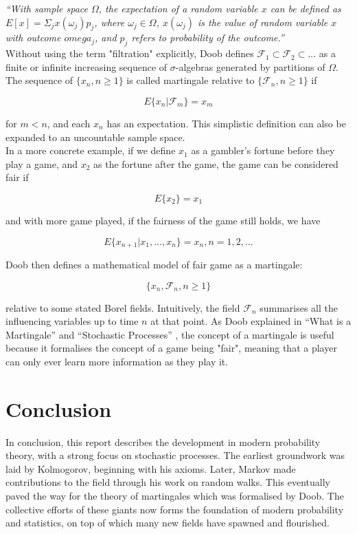 \documentclass{article}
\begin{document}
\textit{``With sample space $\Omega$, the expectation of a random variable $x$ can be defined as $E[x]=\Sigma_j x(\omega_j)p_j$, where $\omega_j \in \Omega$, $x(\omega_j)$ is the value of random variable $x$ with outcome $omega_j$, and $p_j$ refers to probability of the outcome.''} \\

Without using the term "filtration" explicitly, Doob defines $\mathcal{F}_1 \subset \mathcal{F}_2 \subset ...$ as a finite or infinite increasing sequence of $\sigma$-algebras generated by partitions of $\Omega$. The sequence of $\{x_n, n \geq 1\}$ is called martingale relative to $\{\mathcal{F}_n, n \geq 1\}$ if

\begin{equation*}
	E\{x_n | \mathcal{F}_m\}= x_m
\end{equation*}

for $m < n$, and each $x_n$ has an expectation. This simplistic definition can also be expanded to an uncountable sample space. \\

In a more concrete example, if we define $x_1$ as a gambler's fortune before they play a game, and $x_2$ as the fortune after the game, the game can be considered fair if

\begin{equation*}
	E\{x_2\} = x_1
\end{equation*}

and with more game played, if the fairness of the game still holds, we have

\begin{equation*}
	E\{x_{n+1} | x_1, ..., x_n\} = x_n, n=1,2,...
\end{equation*}

Doob then defines a mathematical model of fair game as a martingale:

\begin{equation*}
\{x_n, \mathcal{F}_n, n \geq 1 \}
\end{equation*}

relative to some stated Borel fields. Intuitively, the field $\mathcal{F}_n$ summarises all the influencing variables up to time $n$ at that point. As Doob explained in ``What is a Martingale'' and ``Stochastic Processes'' \parencite{Doob1953,Doob1971}, the concept of a martingale is useful because it formalises the concept of a game being "fair", meaning that a player can only ever learn more information as they play it. 

\section{Conclusion}
In conclusion, this report describes the development in modern probability theory, with a strong focus on stochastic processes. The earliest groundwork was laid by Kolmogorov, beginning with his axioms. Later, Markov made contributions to the field through his work on random walks. This eventually paved the way for the theory of martingales which was formalised by Doob. The collective efforts of these giants now forms the foundation of modern probability and statistics, on top of which many new fields have spawned and flourished.
\printbibliography
\end{document}
